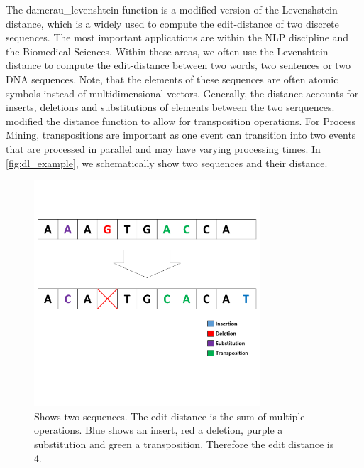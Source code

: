 \documentclass[./../../paper.tex]{subfiles}
\begin{document}
\label{sec:ssdld}
The \gls{damerau_levenshtein} function is a modified version of the Levenshstein distance\autocite{levenshtein_Binarycodescapable_1965}, which is a widely used to compute the edit-distance of two discrete sequences\autocites{apostolico_SequenceAlignmentMolecular_1998,Mitton20101}. The most important applications are within the \gls{NLP} discipline and the Biomedical Sciences. Within these areas, we often use the Levenshtein distance to compute the edit-distance between two words, two sentences or two DNA sequences. Note, that the elements of these sequences are often atomic symbols instead of multidimensional vectors. Generally, the distance accounts for inserts, deletions and substitutions of elements between the two serquences.
\citeauthor{damerau_techniquecomputerdetection_1964} modified the distance function to allow for transposition operations. For Process Mining, transpositions are important as one event can transition into two events that are processed in parallel and may have varying processing times.
In \autoref{fig:dl_example}, we schematically show two sequences and their distance.


\begin{figure}[htb]
    \centering
    \includegraphics[width=0.75\textwidth]{figures/Graphics/Slide6.PNG}
    \caption{Shows two sequences. The edit distance is the sum of multiple operations. Blue shows an insert, red a deletion, purple a substitution and green a transposition. Therefore the edit distance is 4.}
    \label{fig:dl_example}
\end{figure}
\end{document}
